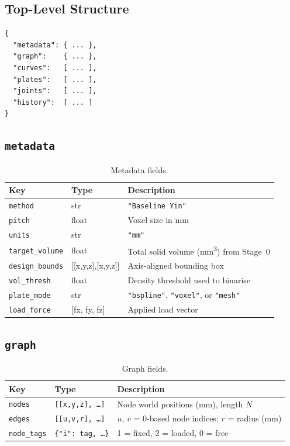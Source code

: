 \documentclass[a4paper, 11pt, openany]{report}
\begin{document}
\subsection{Top-Level Structure}

\begin{lstlisting}[style=textstyle]
{
  "metadata": { ... },
  "graph":    { ... },
  "curves":   [ ... ],
  "plates":   [ ... ],
  "joints":   [ ... ],
  "history":  [ ... ]
}
\end{lstlisting}


\subsection{\texttt{metadata}}

\begin{table}[htbp]
\caption{Metadata fields.}
\label{tab:json-metadata}
\centering
\begin{tabularx}{\textwidth}{llX}
\toprule
Key & Type & Description \\
\midrule
\texttt{method} & str & \texttt{"Baseline Yin"} \\
\texttt{pitch} & float & Voxel size in mm \\
\texttt{units} & str & \texttt{"mm"} \\
\texttt{target\_volume} & float & Total solid volume (mm\textsuperscript{3}) from Stage~0 \\
\texttt{design\_bounds} & [[x,y,z],[x,y,z]] & Axis-aligned bounding box \\
\texttt{vol\_thresh} & float & Density threshold used to binarise \\
\texttt{plate\_mode} & str & \texttt{"bspline"}, \texttt{"voxel"}, or \texttt{"mesh"} \\
\texttt{load\_force} & [fx, fy, fz] & Applied load vector \\
\bottomrule
\end{tabularx}
\end{table}


\subsection{\texttt{graph}}

\begin{table}[htbp]
\caption{Graph fields.}
\label{tab:json-graph}
\centering
\begin{tabularx}{\textwidth}{llX}
\toprule
Key & Type & Description \\
\midrule
\texttt{nodes} & \texttt{[[x,y,z], \ldots]} & Node world positions (mm), length $N$ \\
\texttt{edges} & \texttt{[[u,v,r], \ldots]} & $u$, $v$ = 0-based node indices; $r$ = radius (mm) \\
\texttt{node\_tags} & \texttt{\{"i": tag, \ldots\}} & 1 = fixed, 2 = loaded, 0 = free \\
\bottomrule
\end{tabularx}
\end{table}
\end{document}
